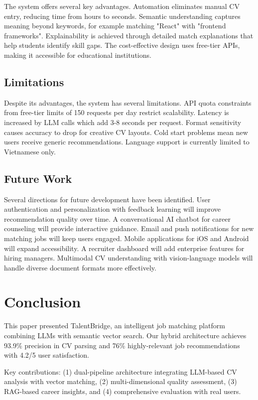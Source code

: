 \documentclass[conference]{IEEEtran}
\begin{document}
The system offers several key advantages. Automation eliminates manual CV entry, reducing time from hours to seconds. Semantic understanding captures meaning beyond keywords, for example matching "React" with "frontend frameworks". Explainability is achieved through detailed match explanations that help students identify skill gaps. The cost-effective design uses free-tier APIs, making it accessible for educational institutions.

\subsection{Limitations}

Despite its advantages, the system has several limitations. API quota constraints from free-tier limits of 150 requests per day restrict scalability. Latency is increased by LLM calls which add 3-8 seconds per request. Format sensitivity causes accuracy to drop for creative CV layouts. Cold start problems mean new users receive generic recommendations. Language support is currently limited to Vietnamese only.

\subsection{Future Work}

Several directions for future development have been identified. User authentication and personalization with feedback learning will improve recommendation quality over time. A conversational AI chatbot for career counseling will provide interactive guidance. Email and push notifications for new matching jobs will keep users engaged. Mobile applications for iOS and Android will expand accessibility. A recruiter dashboard will add enterprise features for hiring managers. Multimodal CV understanding with vision-language models will handle diverse document formats more effectively.

\section{Conclusion}

This paper presented TalentBridge, an intelligent job matching platform combining LLMs with semantic vector search. Our hybrid architecture achieves 93.9\% precision in CV parsing and 76\% highly-relevant job recommendations with 4.2/5 user satisfaction.

Key contributions: (1) dual-pipeline architecture integrating LLM-based CV analysis with vector matching, (2) multi-dimensional quality assessment, (3) RAG-based career insights, and (4) comprehensive evaluation with real users.
\end{document}
